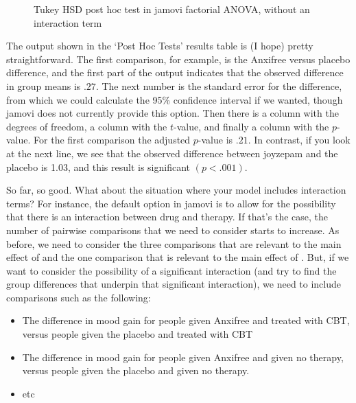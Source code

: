 \begin{figure}[!htb]
\begin{center}
\caption{Tukey HSD post hoc test in jamovi factorial ANOVA, without an interaction term}
\label{fig:factorialanova13}
\HR
\end{center}
\end{figure}

The output shown in the `Post Hoc Tests' results table is (I hope) pretty straightforward. The first comparison, for example, is the Anxifree versus placebo difference, and the first part of the output indicates that the observed difference in group means is $.27$. The next number is the standard error for the difference, from which we could calculate the 95\% confidence interval if we wanted, though jamovi does not currently provide this option. Then there is a column with the degrees of freedom, a column with the $t$-value, and finally a column with the $p$-value. For the first comparison the adjusted $p$-value is $.21$. In contrast, if you look at the next line, we see that the observed difference between joyzepam and the placebo is 1.03, and this result is significant $(p<.001)$.

So far, so good. What about the situation where your model includes interaction terms? For instance, the default option in jamovi is to allow for the possibility that there is an interaction between drug and therapy. If that's the case, the number of pairwise comparisons that we need to consider starts to increase. As before, we need to consider the three comparisons that are relevant to the main effect of  and the one comparison that is relevant to the main effect of . But, if we want to consider the possibility of a significant interaction (and try to find the group differences that underpin that significant interaction), we need to include comparisons such as the following:

\begin{itemize}
\item The difference in mood gain for people given Anxifree and treated with CBT, versus people given the placebo and treated with CBT
\item The difference in mood gain for people given Anxifree and given no therapy, versus people given the placebo and given no therapy.
\item etc
\end{itemize}

